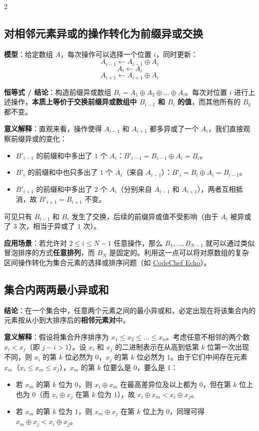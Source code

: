 \begin{multicols*}{2}
		\subsection{对相邻元素异或的操作转化为前缀异或交换}
		\textbf{模型}：给定数组 $A$，每次操作可以选择一个位置 $i$，同时更新：
		$$A_{i-1} \leftarrow A_{i-1} \oplus A_i$$
		$$A_i \leftarrow A_i$$
		$$A_{i+1} \leftarrow A_{i+1} \oplus A_i$$

		\textbf{恒等式 / 结论}：构造前缀异或数组 $B_i = A_1 \oplus A_2 \oplus \dots \oplus A_i$。每次对位置 $i$ 进行上述操作，\textbf{本质上等价于交换前缀异或数组中 $B_{i-1}$ 和 $B_i$ 的值}，而其他所有的 $B_k$ 都不变。

		\textbf{意义解释}：直观来看，操作使得 $A_{i-1}$ 和 $A_{i+1}$ 都多异或了一个 $A_i$，我们直接观察前缀异或的变化：
		\begin{itemize}
			\item $B'_{i-1}$ 的前缀和中多出了 $1$ 个 $A_i$：$B'_{i-1} = B_{i-1} \oplus A_i = B_i$。
			\item $B'_i$ 的前缀和中也只多出了 $1$ 个 $A_i$（来自 $A_{i-1}$）：$B'_i = B_i \oplus A_i = B_{i-1}$。
			\item $B'_{i+1}$ 的前缀和中多出了 $2$ 个 $A_i$（分别来自 $A_{i-1}$ 和 $A_{i+1}$），两者互相抵消，故 $B'_{i+1} = B_{i+1}$ 不变。
		\end{itemize}
		可见只有 $B_{i-1}$ 和 $B_i$ 发生了交换，后续的前缀异或值不受影响（由于 $A_i$ 被异或了 $3$ 次，相当于异或了 $1$ 次）。

		\textbf{应用场景}：若允许对 $2 \le i \le N-1$ 任意操作，那么 $B_1, \dots, B_{N-1}$ 就可以通过类似冒泡排序的方式\textbf{任意排列}，而 $B_N$ 是固定的。利用这一点可以将对原数组的复杂区间操作转化为集合元素的选择或排序问题（如 \href{https://www.codechef.com/START235B/problems/P6235?tab=statement}{CodeChef Echo}）。

		\subsection{集合内两两最小异或和}
		\textbf{结论}：在一个集合中，任意两个元素之间的最小异或和，必定出现在将该集合内的元素按从小到大排序后的\textbf{相邻元素对}中。

		\textbf{意义解释}：假设将集合升序排序为 $x_1 \le x_2 \le \dots \le x_n$。考虑任意不相邻的两个数 $x_i < x_j$（即 $j - i > 1$）。设 $x_i$ 和 $x_j$ 的二进制表示在从高到低第 $k$ 位第一次出现不同，则 $x_i$ 的第 $k$ 位必然为 $0$，$x_j$ 的第 $k$ 位必然为 $1$。由于它们中间存在元素 $x_m$（$x_i \le x_m \le x_j$），$x_m$ 的第 $k$ 位要么是 $0$，要么是 $1$：
		\begin{itemize}
			\item 若 $x_m$ 的第 $k$ 位为 $0$，则 $x_i \oplus x_m$ 在最高差异位及以上都为 $0$，但在第 $k$ 位上也为 $0$（而 $x_i \oplus x_j$ 在第 $k$ 位为 $1$），故 $x_i \oplus x_m < x_i \oplus x_j$。
			\item 若 $x_m$ 的第 $k$ 位为 $1$，则 $x_m \oplus x_j$ 在第 $k$ 位上为 $0$，同理可得 $x_m \oplus x_j < x_i \oplus x_j$。
		\end{itemize}


\end{multicols*}
